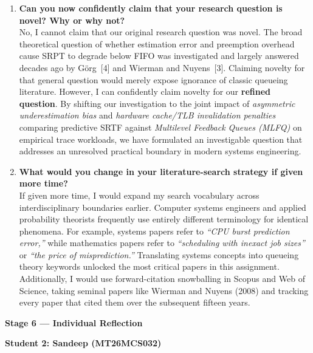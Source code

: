 \documentclass[11pt]{article}
\begin{document}
\begin{enumerate}[leftmargin=1.5em, itemsep=1.0em]
    \item \textbf{Can you now confidently claim that your research question is novel? Why or why not?} \\
    No, I cannot claim that our original research question was novel. The broad theoretical question of whether estimation error and preemption overhead cause SRPT to degrade below FIFO was investigated and largely answered decades ago by G{\"o}rg~[4] and Wierman and Nuyens~[3]. Claiming novelty for that general question would merely expose ignorance of classic queueing literature. However, I can confidently claim novelty for our \textbf{refined question}. By shifting our investigation to the joint impact of \textit{asymmetric underestimation bias} and \textit{hardware cache/TLB invalidation penalties} comparing predictive SRTF against \textit{Multilevel Feedback Queues (MLFQ)} on empirical trace workloads, we have formulated an investigable question that addresses an unresolved practical boundary in modern systems engineering.

    \item \textbf{What would you change in your literature-search strategy if given more time?} \\
    If given more time, I would expand my search vocabulary across interdisciplinary boundaries earlier. Computer systems engineers and applied probability theorists frequently use entirely different terminology for identical phenomena. For example, systems papers refer to \textit{``CPU burst prediction error,''} while mathematics papers refer to \textit{``scheduling with inexact job sizes''} or \textit{``the price of misprediction.''} Translating systems concepts into queueing theory keywords unlocked the most critical papers in this assignment. Additionally, I would use forward-citation snowballing in Scopus and Web of Science, taking seminal papers like Wierman and Nuyens (2008) and tracking every paper that cited them over the subsequent fifteen years.

\end{enumerate}


\newpage
{\centering\fontsize{16}{20}\selectfont\textbf{Stage 6 --- Individual Reflection}\par}
\vspace{1em}

{\centering\fontsize{14}{16.8}\selectfont \textbf{Student 2: Sandeep (MT26MCS032)}\par}
\vspace{1em}
\end{document}
